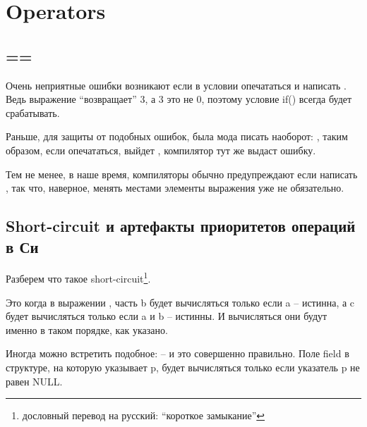 ﻿\section{Operators}

\subsection{==}

Очень неприятные ошибки возникают если в условии  опечататься и написать .
Ведь выражение  ``возвращает'' 3, а 3 это не 0, поэтому условие if() всегда будет 
срабатывать.

Раньше, для защиты от подобных ошибок, была мода писать наоборот: , таким образом,
если опечататься, выйдет , компилятор тут же выдаст ошибку.

Тем не менее, в наше время, компиляторы обычно предупреждают если написать , 
так что, наверное, менять местами элементы выражения уже не обязательно.

\subsection{Short-circuit и артефакты приоритетов операций в Си}

Разберем что такое short-circuit\footnote{дословный перевод на русский: ``короткое замыкание''}.

Это когда в выражении , часть b будет вычисляться только если a -- истинна,
а c будет вычисляться
только если a и b -- истинны. И вычисляться они будут именно в таком порядке, как указано.

Иногда можно встретить подобное:  -- и это совершенно правильно.
Поле field в структуре,
на которую указывает p, будет вычисляться только если указатель p не равен NULL.

